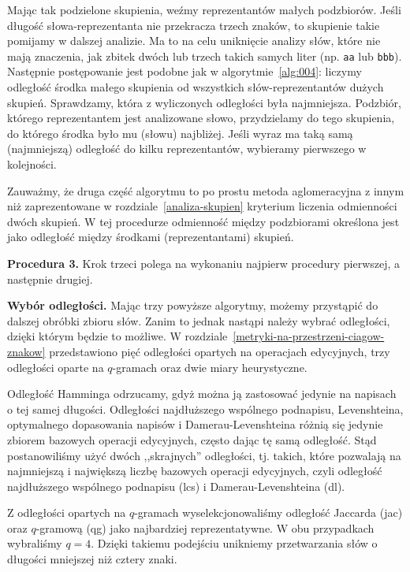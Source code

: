 \documentclass{praca1}
\begin{document}
Mając tak podzielone skupienia, weźmy reprezentantów małych podzbiorów. Jeśli długość słowa-reprezentanta nie przekracza trzech znaków, to skupienie takie pomijamy w dalszej analizie. Ma to na celu uniknięcie analizy słów, które nie mają znaczenia, jak zbitek dwóch lub trzech takich samych liter (np. \verb|aa| lub \verb|bbb|). Następnie postępowanie jest podobne jak w algorytmie~\ref{alg:004}: liczymy odległość środka małego skupienia od wszystkich słów-reprezentantów dużych skupień. Sprawdzamy, która z wyliczonych odległości była najmniejsza. Podzbiór, którego reprezentantem jest analizowane słowo, przydzielamy do tego skupienia, do którego środka było mu (słowu) najbliżej. Jeśli wyraz ma taką samą (najmniejszą) odległość do kilku reprezentantów, wybieramy pierwszego w kolejności.

Zauważmy, że druga część algorytmu to po prostu metoda aglomeracyjna z innym niż zaprezentowane w rozdziale~\ref{analiza-skupien} kryterium liczenia odmienności dwóch skupień. W tej procedurze odmienność między podzbiorami określona jest jako odległość między środkami (reprezentantami) skupień.



\textbf{Procedura 3.} Krok trzeci polega na wykonaniu najpierw procedury pierwszej, a następnie drugiej.

\textbf{Wybór odległości.} Mając trzy powyższe algorytmy, możemy przystąpić do dalszej obróbki zbioru słów. Zanim to jednak nastąpi należy wybrać odległości, dzięki którym będzie to możliwe. W rozdziale~\ref{metryki-na-przestrzeni-ciagow-znakow} przedstawiono pięć odległości opartych na operacjach edycyjnych, trzy odległości oparte na $q$-gramach oraz dwie miary heurystyczne. 

Odległość Hamminga odrzucamy, gdyż można ją zastosować jedynie na napisach o tej samej długości. Odległości najdłuższego wspólnego podnapisu, Levenshteina, optymalnego dopasowania napisów i Damerau-Levenshteina różnią się jedynie zbiorem bazowych operacji edycyjnych, często dając tę samą odległość. Stąd postanowiliśmy użyć dwóch ,,skrajnych'' odległości, tj. takich, które pozwalają na najmniejszą i największą liczbę bazowych operacji edycyjnych, czyli odległość najdłuższego wspólnego podnapisu (lcs) i Damerau-Levenshteina (dl). 

Z odległości opartych na $q$-gramach wyselekcjonowaliśmy odległość Jaccarda (jac) oraz $q$-gramową (qg) jako najbardziej reprezentatywne. W obu przypadkach wybraliśmy $q=4$. Dzięki takiemu podejściu unikniemy przetwarzania słów o długości mniejszej niż cztery znaki.
\end{document}
